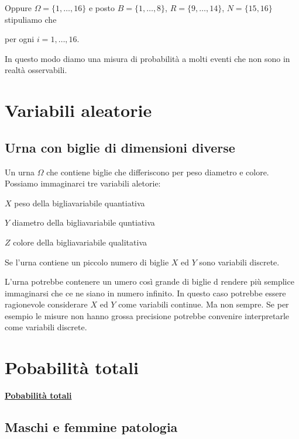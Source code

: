 \documentclass[12pt,openany]{book}
\theoremstyle{mio}
\theoremstyle{liscio}
\begin{document}
Oppure $\Omega=\{1,\dots,16\}$ e posto $B=\{1,\dots,8\}$, $R=\{9,\dots,14\}$, $N=\{15,16\}$ stipuliamo che 


\hfil per ogni $i=1,\dots,16$.

In questo modo diamo una misura di probabilità a molti eventi che non sono in realtà osservabili. 



\hfill{}\clearpage\section{Variabili aleatorie}

\subsection{Urna con biglie di dimensioni diverse}
\label{Urna_biglie_diverse}

Un urna $\Omega$ che contiene biglie che differiscono per peso diametro e colore. Possiamo immaginarci tre variabili aletorie:

$X$ peso della biglia\hfill variabile quantiativa

$Y$ diametro della biglia\hfill variabile quntiativa

$Z$ colore della biglia\hfill variabile qualitativa

Se l'urna contiene un piccolo numero di biglie $X$ ed $Y$ sono variabili discrete.

L'urna potrebbe contenere un umero così grande di biglie d rendere più semplice immaginarsi che ce ne siano in numero infinito. In questo caso potrebbe essere ragionevole considerare $X$ ed $Y$ come variabili continue. Ma non sempre. Se per esempio le misure non hanno grossa precisione potrebbe convenire interpretarle come variabili discrete.

\hfill{}\clearpage\section{Pobabilità totali}


\hfill\textbf{{\color{brown}\hyperref[TeoremaProbabilitaTotali]{Pobabilità totali} \faShare}}
\subsection{Maschi e femmine patologia}
\label{MF_totali}
\end{document}
